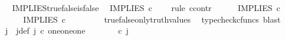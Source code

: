 \begin{isabellebody}
\isamarkupfalse%
%
\endisatagproof
{\isafoldproof}%
%
\isadelimproof
\ \isanewline
%
\endisadelimproof
\isanewline
{}\isamarkupfalse%
\ IMPLIES{\isacharunderscore}{\kern0pt}true{\isacharunderscore}{\kern0pt}false{\isacharunderscore}{\kern0pt}is{\isacharunderscore}{\kern0pt}false{\isacharcolon}{\kern0pt}\isanewline
\ \ {\isachardoublequoteopen}IMPLIES\ {\isasymcirc}\isactrlsub c\ \ {\isasymlangle}{\isasymt}{\isacharcomma}{\kern0pt}{\isasymf}{\isasymrangle}\ {\isacharequal}{\kern0pt}\ {\isasymf}{\isachardoublequoteclose}\isanewline
%
\isadelimproof
%
\endisadelimproof
%
\isatagproof
{}\isamarkupfalse%
{\isacharparenleft}{\kern0pt}rule\ ccontr{\isacharparenright}{\kern0pt}\ \ \isanewline
\ \ \isamarkupfalse%
\ {\isachardoublequoteopen}IMPLIES\ {\isasymcirc}\isactrlsub c\ {\isasymlangle}{\isasymt}{\isacharcomma}{\kern0pt}{\isasymf}{\isasymrangle}\ {\isasymnoteq}\ {\isasymf}{\isachardoublequoteclose}\isanewline
\ \ \isamarkupfalse%
\ \isamarkupfalse%
\ {\isachardoublequoteopen}IMPLIES\ {\isasymcirc}\isactrlsub c\ {\isasymlangle}{\isasymt}{\isacharcomma}{\kern0pt}{\isasymf}{\isasymrangle}\ {\isacharequal}{\kern0pt}\ {\isasymt}{\isachardoublequoteclose}\isanewline
\ \ \ \ \isamarkupfalse%
\ true{\isacharunderscore}{\kern0pt}false{\isacharunderscore}{\kern0pt}only{\isacharunderscore}{\kern0pt}truth{\isacharunderscore}{\kern0pt}values\ \isamarkupfalse%
\ {\isacharparenleft}{\kern0pt}typecheck{\isacharunderscore}{\kern0pt}cfuncs{\isacharcomma}{\kern0pt}\ blast{\isacharparenright}{\kern0pt}\isanewline
\ \ \isamarkupfalse%
\ \isamarkupfalse%
\ j\ \ j{\isacharunderscore}{\kern0pt}def{\isacharcolon}{\kern0pt}\ {\isachardoublequoteopen}j\ {\isasymin}\isactrlsub c\ one{\isasymCoprod}{\isacharparenleft}{\kern0pt}one{\isasymCoprod}one{\isacharparenright}{\kern0pt}\ {\isasymand}\ {\isacharparenleft}{\kern0pt}{\isasymlangle}{\isasymt}{\isacharcomma}{\kern0pt}\ {\isasymt}{\isasymrangle}{\isasymamalg}\ {\isacharparenleft}{\kern0pt}{\isasymlangle}{\isasymf}{\isacharcomma}{\kern0pt}\ {\isasymf}{\isasymrangle}\ {\isasymamalg}{\isasymlangle}{\isasymf}{\isacharcomma}{\kern0pt}\ {\isasymt}{\isasymrangle}{\isacharparenright}{\kern0pt}{\isacharparenright}{\kern0pt}\ {\isasymcirc}\isactrlsub c\ j\ \ {\isacharequal}{\kern0pt}\ {\isasymlangle}{\isasymt}{\isacharcomma}{\kern0pt}{\isasymf}{\isasymrangle}{\isachardoublequoteclose}\isanewline
\ \ \ \ \isamarkupfalse%

\end{isabellebody}
